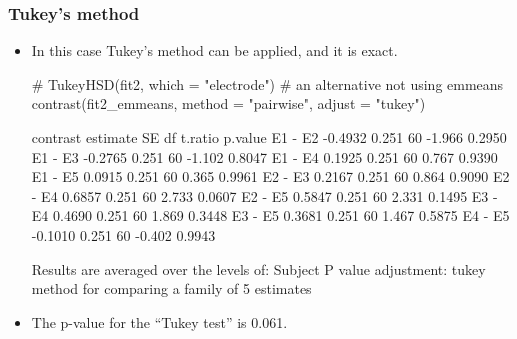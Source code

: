 \documentclass[a4paper]{article}
\begin{document}
\subsubsection{Tukey's method}
\begin{itemize}
	\item In this case Tukey's method can be applied, and it is exact.
\begin{Schunk}
\begin{Sinput}
# TukeyHSD(fit2, which = "electrode") # an alternative not using emmeans
contrast(fit2_emmeans, method = "pairwise", adjust = "tukey")
\end{Sinput}
\begin{Soutput}
 contrast estimate    SE df t.ratio p.value
 E1 - E2   -0.4932 0.251 60  -1.966  0.2950
 E1 - E3   -0.2765 0.251 60  -1.102  0.8047
 E1 - E4    0.1925 0.251 60   0.767  0.9390
 E1 - E5    0.0915 0.251 60   0.365  0.9961
 E2 - E3    0.2167 0.251 60   0.864  0.9090
 E2 - E4    0.6857 0.251 60   2.733  0.0607
 E2 - E5    0.5847 0.251 60   2.331  0.1495
 E3 - E4    0.4690 0.251 60   1.869  0.3448
 E3 - E5    0.3681 0.251 60   1.467  0.5875
 E4 - E5   -0.1010 0.251 60  -0.402  0.9943

Results are averaged over the levels of: Subject 
P value adjustment: tukey method for comparing a family of 5 estimates 
\end{Soutput}
\end{Schunk}
	\item The p-value for the ``Tukey test'' is 0.061.
\end{itemize}
\end{document}
